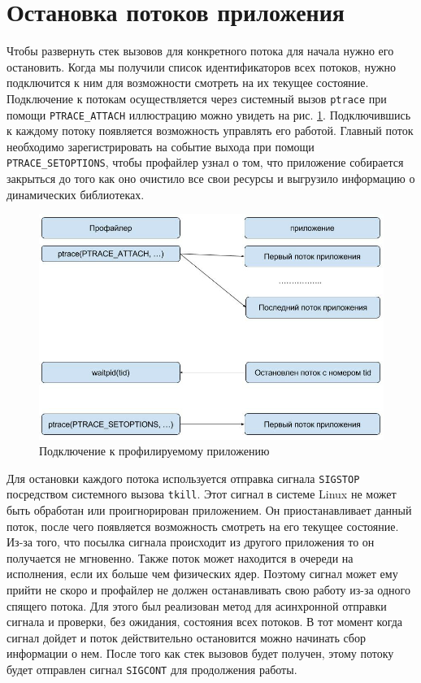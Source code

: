 \section{Остановка потоков приложения}
	Чтобы развернуть стек вызовов для конкретного потока для начала нужно его остановить. Когда мы получили список идентификаторов всех потоков, нужно подключится к ним для возможности смотреть на их текущее состояние. Подключение к потокам осуществляется через системный вызов \verb|ptrace| при помощи \verb|PTRACE_ATTACH| иллюстрацию можно увидеть на рис. \ref{fig:ptrace_attach}. Подключившись к каждому потоку появляется возможность управлять его работой. Главный поток необходимо зарегистрировать на событие выхода при помощи \verb|PTRACE_SETOPTIONS|, чтобы профайлер узнал о том, что приложение собирается закрыться до того как оно очистило все свои ресурсы и выгрузило информацию о динамических библиотеках.
    
    \begin{figure}[H]
        \caption{Подключение к профилируемому приложению}
        \label{fig:ptrace_attach}
        \centering
        \includegraphics[width=\linewidth]{images/ptrace_attach}
    \end{figure}    
    
    Для остановки каждого потока используется отправка сигнала \verb|SIGSTOP| посредством системного вызова \verb|tkill|. Этот сигнал в системе Linux не может быть обработан или проигнорирован приложением. Он приостанавливает данный поток, после чего появляется возможность смотреть на его текущее состояние. Из-за того, что посылка сигнала происходит из другого приложения то он получается не мгновенно. Также поток может находится в очереди на исполнения, если их больше чем физических ядер. Поэтому сигнал может ему прийти не скоро и профайлер не должен останавливать свою работу из-за одного спящего потока. Для этого был реализован метод для асинхронной отправки сигнала и проверки, без ожидания, состояния всех потоков. В тот момент когда сигнал дойдет и поток действительно остановится можно начинать сбор информации о нем. После того как стек вызовов будет получен, этому потоку будет отправлен сигнал \verb|SIGCONT| для продолжения работы.
    
